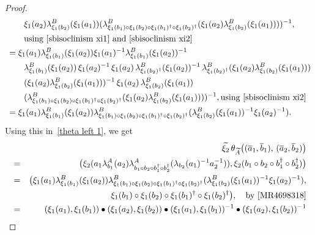\documentclass{jonasart}
\theoremstyle{plain}
\begin{document}
\begin{proof}
\begin{align*}
			&\qquad\xi_1 (a_2 )\lambda^B_{\xi_1 (b_2 )}(\xi_1 (a_1 ))(\lambda^B_{\xi_1 (b_1 )\circ\xi_1 ( b_2 )\circ \xi_1 (b_1 )^\dagger\circ \xi_1 (b_2 )^\dagger}(\xi_1 (a_2 )\lambda^B_{\xi_1 (b_2 )}(\xi_1 (a_1 )) ))^{-1}, \\
			&\qquad \text{using \eqref{sbisoclinism xi1} and \eqref{sbisoclinism xi2}} \\
			&=\xi_1 (a_1 )\lambda^B_{\xi_1 (b_1 )}(\xi_1 (a_2 )) \xi_1 (a_1 )^{-1} \lambda^B_{\xi_1 (b_1 )}(\xi_1 (a_2 ))^{-1} \\
			&\qquad\lambda^B_{\xi_1 (b_1 )}(\xi_1 (a_2 )) \, \xi_1 (a_2 )^{-1} \, \xi_1 (a_2 ) \, \lambda^B_{\xi_1 (b_2 )^\dagger}(\xi_1 (a_2 ))^{-1} \, \lambda^B_{\xi_1 (b_2 )^\dagger}(\xi_1 (a_2 )\lambda^B_{\xi_1 (b_2 )}(\xi_1 (a_1 ))) \\
			&\qquad (\xi_1 (a_2) \lambda^B_{\xi_1 (b_2 )}(\xi_1 (a_1 )))^{-1} \, \xi_1 (a_2) \, \lambda^B_{\xi_1 (b_2 )}(\xi_1 (a_1 )) \\
			&\qquad (\lambda^B_{\xi_1 (b_1 )\circ\xi_1 ( b_2 )\circ \xi_1 (b_1 )^\dagger\circ \xi_1 (b_2 )^\dagger}(\xi_1 (a_2 )\lambda^B_{\xi_1 (b_2 )}(\xi_1 (a_1 )) ))^{-1}, \text{using \eqref{sbisoclinism xi2}} \\
			&=\xi_1 (a_1 )\lambda^B_{\xi_1 (b_1 )}(\xi_1 (a_2 ))\lambda^B_{\xi_1 (b_1 )\circ\xi_1 ( b_2 )\circ \xi_1 (b_1 )^\dagger\circ \xi_1 (b_2 )^\dagger}(\lambda^B_{\xi_1 (b_2 )}(\xi_1 (a_1 ))^{-1}\xi_1 (a_2 )^{-1} ).
		\end{align*}
		Using this in~\eqref{theta left 1}, we get
		\begin{eqnarray*}
			&& \widetilde{\xi_2} \, \theta_{\widetilde{A}} \big((\overline{a}_1,\overline{b}_1 ), \, (\overline{a}_2,\overline{b}_2 ) \big)\nonumber\\
			&=&\big(\xi_2 (a_1\lambda^A_{b_1}(a_2 )\lambda^A_{b_1\circ b_2\circ b_1^\dagger\circ b_2^\dagger}(\lambda_{b_2}(a_1 )^{-1} a_2^{-1})),\xi_2 (b_1\circ b_2\circ b_1^\dagger\circ b_2^\dagger)\big)\\
			&=&\big(\xi_1 (a_1 )\lambda^B_{\xi_1 (b_1 )}(\xi_1 (a_2 ))\lambda^B_{\xi_1 (b_1 )\circ\xi_1 ( b_2 )\circ \xi_1 (b_1 )^\dagger\circ \xi_1 (b_2 )^\dagger}(\lambda^B_{\xi_1 (b_2 )}(\xi_1 (a_1 ))^{-1}\xi_1 (a_2 )^{-1} ),\\
			&&\xi_1 (b_1 )\circ \xi_1 (b_2 )\circ \xi_1 (b_1 )^\dagger\circ \xi _1 (b_2 )^\dagger \big),\quad \text{by~\cite[Proposition 3.9]{MR4698318}}\\
			&=&(\xi_1 (a_1 ),\xi_1 (b_1 )) \bullet (\xi_1 (a_2 ),\xi_1 (b_2 )) \bullet (\xi_1 (a_1 ),\xi_1 (b_1 )) ^{-1}\bullet (\xi_1 (a_2 ),\xi_1 (b_2 ))^{-1}\nonumber\\

\end{eqnarray*}
\end{proof}
\end{document}
